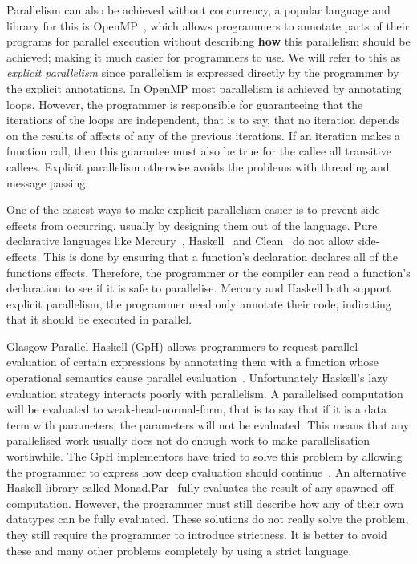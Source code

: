 Parallelism can also be achieved without concurrency,
a popular language and library for this is OpenMP~\citep{openmp},
which allows programmers to annotate parts of their programs for parallel
execution without describing \textbf{how} this parallelism should be achieved;
making it much easier for programmers to use.
We will refer to this as \emph{explicit parallelism}
since parallelism is expressed directly by the programmer by the explicit
annotations.
In OpenMP most parallelism is achieved by annotating loops.
However,
the programmer is responsible for guaranteeing that the iterations of the loops
are independent,
that is to say, that no iteration depends on the results of affects of any of
the previous iterations.
If an iteration makes a function call, then this guarantee must also be true for
the callee all transitive callees.
Explicit parallelism otherwise avoids the problems with threading and message
passing.

One of the easiest ways to make explicit parallelism easier is to prevent
side-effects from occurring, usually by designing them out of the language.
Pure declarative languages like Mercury~\citep{mercury_jlp},
Haskell~\citep{haskell98} and Clean~\citep{1991:concurrent-clean} do not
allow side-effects.
This is done by ensuring that a function's declaration declares all of the
functions effects.
Therefore,
the programmer or the compiler can read a function's declaration to see if it
is safe to parallelise.
Mercury and Haskell both support explicit parallelism,
the programmer need only annotate their code, indicating that it should be
executed in parallel.

Glasgow Parallel Haskell (GpH) allows programmers to request parallel
evaluation of certain expressions by annotating them with a function
whose operational semantics cause parallel
evaluation~\citep{gph,loidi:2008:gph-semiexplicit-parallelism}.
Unfortunately Haskell's lazy evaluation strategy interacts poorly with
parallelism.
A parallelised computation will be evaluated to weak-head-normal-form,
that is to say that if it is a data term with parameters,
the parameters will not be evaluated.
This means that any parallelised work usually does not do enough work to
make parallelisation worthwhile.
The GpH implementors have tried to solve this problem by allowing
the programmer to express how deep evaluation should
continue~\citep{trinder:98:strategies}.
An alternative Haskell library called Monad.Par~\citep{marlow:monadpar}
fully evaluates the result of any spawned-off computation.
However, the programmer must still describe how any of their own
datatypes can be fully evaluated.
These solutions do not really solve the problem,
they still require the programmer to introduce strictness.
It is better to avoid these and many other problems completely by using
a strict language.

